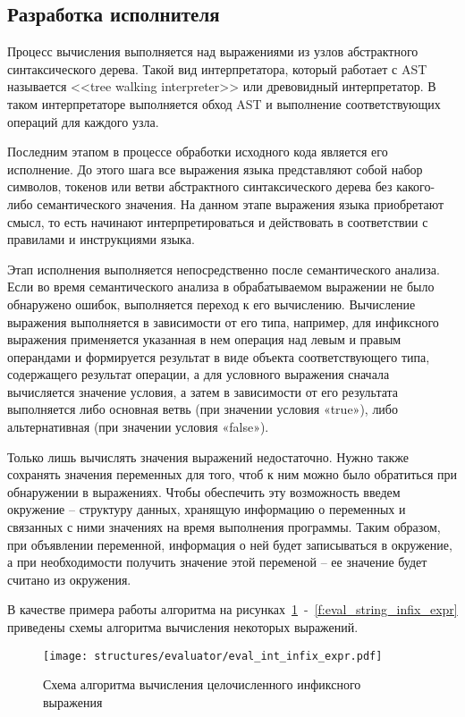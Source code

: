 \subsection{Разработка исполнителя}

Процесс вычисления выполняется над выражениями из узлов абстрактного синтаксического дерева.
Такой вид интерпретатора, который работает с AST называется <<tree walking interpreter>> или древовидный интерпретатор.
В таком интерпретаторе выполняется обход AST и выполнение соответствующих операций для каждого узла.

Последним этапом в процессе обработки исходного кода является его исполнение.
До этого шага все выражения языка представляют собой набор символов, токенов или ветви абстрактного синтаксического дерева без какого-либо семантического значения.
На данном этапе выражения языка приобретают смысл, то есть начинают интерпретироваться и действовать в соответствии с правилами и инструкциями языка.

Этап исполнения выполняется непосредственно после семантического анализа.
Если во время семантического анализа в обрабатываемом выражении не было обнаружено ошибок, выполняется переход к его вычислению.
Вычисление выражения выполняется в зависимости от его типа, например,
для инфиксного выражения применяется указанная в нем операция над левым и правым операндами и формируется результат в виде объекта соответствующего типа,
содержащего результат операции, а для условного выражения сначала вычисляется значение условия,
а затем в зависимости от его результата выполняется либо основная ветвь (при значении условия «true»), либо альтернативная (при значении условия «false»).

Только лишь вычислять значения выражений недостаточно.
Нужно также сохранять значения переменных для того, чтоб к ним можно было обратиться при обнаружении в выражениях.
Чтобы обеспечить эту возможность введем окружение – структуру данных, хранящую информацию о переменных и связанных с ними значениях на время выполнения программы.
Таким образом, при объявлении переменной, информация о ней будет записываться в окружение, а при необходимости получить значение этой переменой – ее значение будет считано из окружения.

В качестве примера работы алгоритма на рисунках~\ref{f:eval_int_infix_expr}~-~\ref{f:eval_string_infix_expr} приведены схемы алгоритма вычисления некоторых выражений.

\begin{figure}[!htp]
	\centering
	\vspace{\toppaddingoffigure}
	\texttt{[image: structures/evaluator/eval\_int\_infix\_expr.pdf]}
	\caption{Схема алгоритма вычисления целочисленного инфиксного выражения}
	\label{f:eval_int_infix_expr}
\end{figure}

